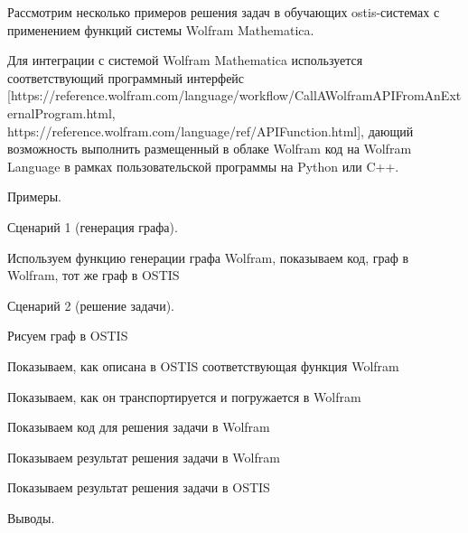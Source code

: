 Рассмотрим несколько примеров решения задач в обучающих ostis-системах с применением функций системы Wolfram Mathematica. 

Для интеграции с системой Wolfram Mathematica используется соответствующий программный интерфейс [https://reference.wolfram.com/language/workflow/CallAWolframAPIFromAnExternalProgram.html, https://reference.wolfram.com/language/ref/APIFunction.html], дающий возможность выполнить размещенный в облаке Wolfram код на Wolfram Language в рамках пользовательской программы на Python или C++.

Примеры.

Сценарий 1 (генерация графа).
\begin{textitemize}
	\item Используем функцию генерации графа Wolfram, показываем код, граф в Wolfram, тот же граф в OSTIS
\end{textitemize}	

Сценарий 2 (решение задачи).
\begin{textitemize}
	\item Рисуем граф в OSTIS
	\item Показываем, как описана в OSTIS соответствующая функция Wolfram
	\item Показываем, как он транспортируется и погружается в Wolfram
	\item Показываем код для решения задачи в Wolfram
	\item Показываем результат решения задачи в Wolfram
	\item Показываем результат решения задачи в OSTIS
\end{textitemize}	

Выводы.